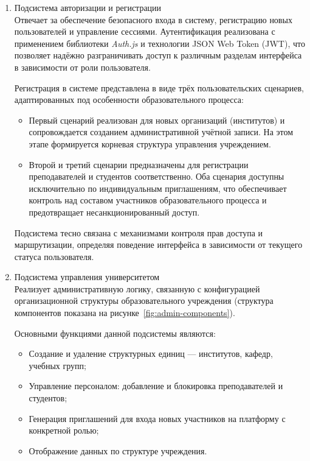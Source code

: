 \begin{enumerate}
  \item Подсистема авторизации и регистрации\\
  Отвечает за обеспечение безопасного входа в систему, регистрацию новых пользователей и управление сессиями. Аутентификация реализована с применением библиотеки \textit{Auth.js} и технологии JSON Web Token (JWT), что позволяет надёжно разграничивать доступ к различным разделам интерфейса в зависимости от роли пользователя.

  Регистрация в системе представлена в виде трёх пользовательских сценариев, адаптированных под особенности образовательного процесса:
  \begin{itemize}
    \item Первый сценарий реализован для новых организаций (институтов) и сопровождается созданием административной учётной записи. На этом этапе формируется корневая структура управления учреждением.
    \item Второй и третий сценарии предназначены для регистрации преподавателей и студентов соответственно. Оба сценария доступны исключительно по индивидуальным приглашениям, что обеспечивает контроль над составом участников образовательного процесса и предотвращает несанкционированный доступ.
  \end{itemize}
  
  Подсистема тесно связана с механизмами контроля прав доступа и маршрутизации, определяя поведение интерфейса в зависимости от текущего статуса пользователя.

  \item Подсистема управления университетом\\
  Реализует административную логику, связанную с конфигурацией организационной структуры образовательного учреждения (структура компонентов показана на рисунке~\ref{fig:admin-components}).
  
  Основными функциями данной подсистемы являются:
  \begin{itemize}
    \item Создание и удаление структурных единиц — институтов, кафедр, учебных групп;
    \item Управление персоналом: добавление и блокировка преподавателей и студентов;
    \item Генерация приглашений для входа новых участников на платформу с конкретной ролью;
    \item Отображение данных по структуре учреждения.
  \end{itemize}
  

\end{enumerate}
